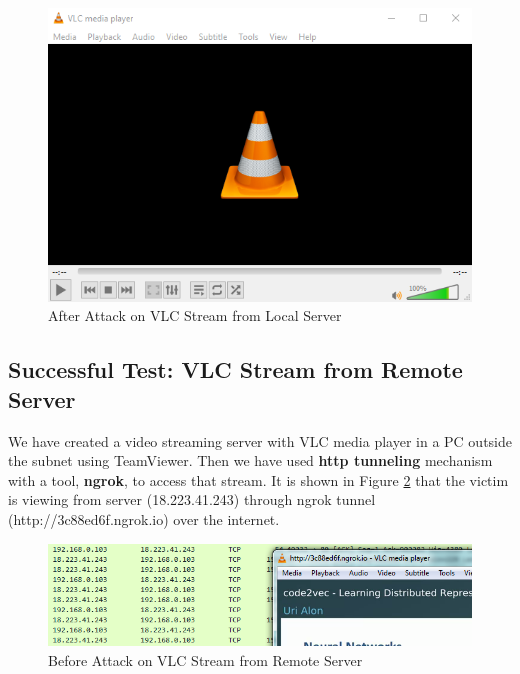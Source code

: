 \documentclass[14pt]{extarticle}
\begin{document}
        \begin{figure}
            \centering
            \includegraphics[width=.95\textwidth]{Pictures/RST_Local/after.png}
            \caption{After Attack on VLC Stream from Local Server}
            \label{fig:after_local}
        \end{figure}
        
        
    \newpage
    \subsection{Successful Test: VLC Stream from Remote Server}
        \label{sec:remote_vlc}
        We have created a video streaming server with VLC media player in a PC outside the subnet using TeamViewer. Then we have used \textbf{http tunneling} mechanism with a tool, \textbf{ngrok}, to access that stream. It is shown in Figure \ref{fig:before_remote} that the victim is viewing from server (18.223.41.243) through ngrok tunnel (http://3c88ed6f.ngrok.io) over the internet.
        
        \begin{figure}[!h]
            \centering
            \includegraphics[width=.95\textwidth]{Pictures/RST_Remote/before.png}
            \caption{Before Attack on VLC Stream from Remote Server}
            \label{fig:before_remote}
        \end{figure}
        
\end{document}
